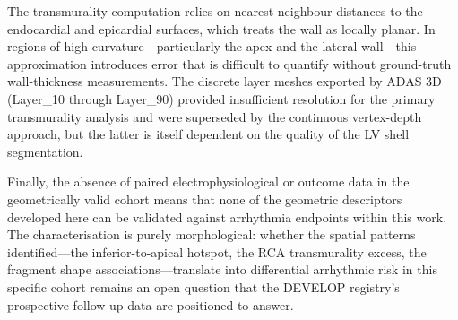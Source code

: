 The transmurality computation relies on nearest-neighbour distances to the endocardial and
epicardial surfaces, which treats the wall as locally planar. In regions of high curvature---particularly
the apex and the lateral wall---this approximation introduces error that is difficult to quantify
without ground-truth wall-thickness measurements. The discrete layer meshes exported by
ADAS 3D (Layer\_10 through Layer\_90) provided insufficient resolution for the primary
transmurality analysis and were superseded by the continuous vertex-depth approach, but
the latter is itself dependent on the quality of the LV shell segmentation.

Finally, the absence of paired electrophysiological or outcome data in the geometrically valid
cohort means that none of the geometric descriptors developed here can be validated against
arrhythmia endpoints within this work. The characterisation is purely morphological: whether
the spatial patterns identified---the inferior-to-apical hotspot, the RCA transmurality excess,
the fragment shape associations---translate into differential arrhythmic risk in this specific
cohort remains an open question that the DEVELOP registry's prospective follow-up data are
positioned to answer.
